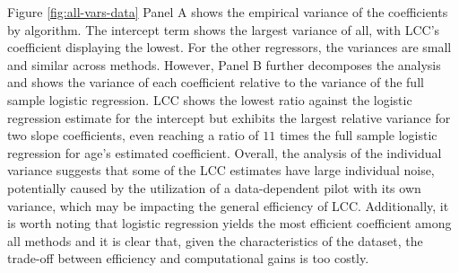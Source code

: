 Figure \ref{fig:all-vars-data} Panel A shows the empirical variance of the coefficients by algorithm. The intercept term shows the largest variance of all, with LCC's coefficient displaying the lowest. For the other regressors, the variances are small and similar across methods. However, Panel B further decomposes the analysis and shows the variance of each coefficient relative to the variance of the full sample logistic regression. LCC shows the lowest ratio against the logistic regression estimate for the intercept but exhibits the largest relative variance for two slope coefficients, even reaching a ratio of $11$ times the full sample logistic regression for age's estimated coefficient. Overall, the analysis of the individual variance suggests that some of the LCC estimates have large individual noise, potentially caused by the utilization of a data-dependent pilot with its own variance, which may be impacting the general efficiency of LCC. Additionally, it is worth noting that logistic regression yields the most efficient coefficient among all methods and it is clear that, given the characteristics of the dataset, the trade-off between efficiency and computational gains is too costly. 

